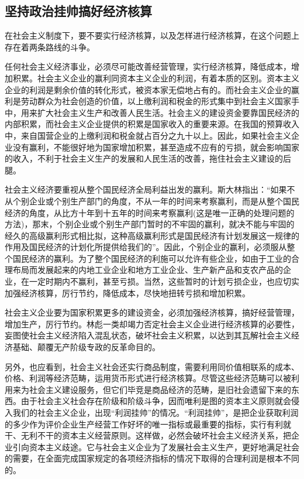 \documentclass{book}
\begin{document}
\subsection{坚持政治挂帅搞好经济核算}

在社会主义制度下，要不要实行经济核算，以及怎样进行经济核算，在这个问题上存在着两条路线的斗争。

任何社会主义经济事业，必须尽可能改善经营管理，实行经济核算，降低成本，增加积累。社会主义企业的赢利同资本主义企业的利润，有着本质的区别。资本主义企业的利润是剩余价值的转化形式，被资本家无偿地占有的。而社会主义企业的赢利是劳动群众为社会创造的价值，以上缴利润和税金的形式集中到社会主义国家手中，用来扩大社会主义生产和改善人民生活。社会主义的建设资金要靠国民经济的内部积累，而社会主义企业提供的积累是国家收入的重要来源。在我国的预算收入中，来自国营企业的上缴利润和税金就占百分之九十以上。因此，如果社会主义企业没有赢利，不能很好地为国家增加积累，甚至造成不应有的亏损，就会影响国家的收入，不利于社会主义生产的发展和人民生活的改善，拖住社会主义建设的后腿。

社会主义经济要重视从整个国民经济全局利益出发的赢利。斯大林指出：“如果不从个别企业或个别生产部门的角度，不从一年的时间来考察赢利，而是从整个国民经济的角度，从比方十年到十五年的时间来考察赢利(这是唯一正确的处理问题的方法)，那末，个别企业或个别生产部门暂时的不牢固的赢利，就决不能与牢固的经久的高级赢利形式相比拟，这种高级赢利形式是国民经济有计划发展这一规律的作用及国民经济的计划化所提供给我们的”。因此，个别企业的赢利，必须服从整个国民经济的赢利。为了整个国民经济的利施可以允许有些企业，如由于工业的合理布局而发展起来的内地工业企业和地方工业企业、生产新产品和支农产品的企业，在一定时期内不赢利，甚至亏损。当然，这些暂时的计划亏损企业，也应切实加强经济核算，厉行节约，降低成本，尽快地扭转亏损和增加积累。

社会主义企业要为国家积累更多的建设资金，必须加强经济核算，搞好经营管理，增加生产，厉行节约。林彪一类却竭力否定社会主义企业进行经济核算的必要性，妄图使社会主义经济陷入混乱状态，破坏社会主义积累，以达到其瓦解社会主义经济基础、颠覆无产阶级专政的反革命目的。

另外，也应看到，社会主义社会还实行商品制度，需要利用同价值相联系的成本、价格、利润等经济范畴，运用货币形式进行经济核算。尽管这些经济范畴可以被利用来为社会主义建设服务，但它们毕竞是商品经济的范畴，是旧社会遗留下来的东西。由于社会主义社会存在阶级和阶级斗争，因而唯利是图的资本主义原则就会侵入我们的社会主义企业，出现“利润挂帅”的情况。“利润挂帅”，是把企业获取利润的多少作为评价企业生产经营工作好坏的唯一指标或最重要的指标，实行有利就干、无利不干的资本主义经营原则。这样做，必然会破坏社会主义经济关系，把企业引向资本主义歧途。它与社会主义企业为了发展社会主义生产，更好地满足社会的需要，在全面完成国家规定的各项经济指标的情况下取得的合理利润是根本不同的。
\end{document}
